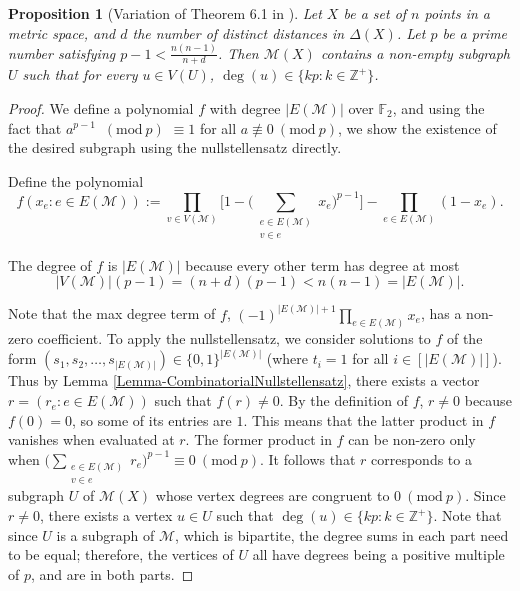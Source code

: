 \documentclass[12pt]{article}
\newcommand{\Z}{\mathbb{Z}}
\newcommand{\Mod}[1]{\ (\mathrm{mod}\ #1)}
\newtheorem{prop}[thm]{Proposition}
\theoremstyle{definition}
\begin{document}
	\begin{prop}[Variation of Theorem 6.1 in \cite{alon}]\label{Prop-SubgraphNullstellensatzResult}
		Let $X$ be a set of $n$ points in a metric space, and $d$ the number of distinct distances in $\Delta(X)$.  Let $p$ be a prime number satisfying $p-1 < \tfrac{n(n-1)}{n+d}$.  Then $\mathcal{M}(X)$ contains a non-empty subgraph $U$ such that for every $u \in V(U)$, $\deg(u) \in \{kp: k \in \Z^+\}$.  %
	\end{prop}
	\begin{proof}
		We define a polynomial $f$ with degree $|E(\mathcal{M})|$ over $\mathbb{F}_2$, and using the fact that $a^{p-1}$ $\Mod{p}$ $\equiv 1$ for all $a \not\equiv 0 \Mod{p}$, we show the existence of the desired subgraph using the nullstellensatz directly.
		
		Define the polynomial
		$$f(x_e:e \in E(\mathcal{M})) := \prod_{v \in V(\mathcal{M})} \biggr[1 - \Big(\sum_{\substack{e \in E(\mathcal{M})\\ v \in e}}x_e \Big)^{p-1} \biggr] - \prod_{e \in E(\mathcal{M})}(1-x_e).$$
		
		The degree of $f$ is $|E(\mathcal{M})|$ because every other term has degree at most
		$$|V(\mathcal{M})| (p-1) = (n+d)(p-1) < n(n-1) = |E(\mathcal{M})|.$$
		
		Note that the max degree term of $f$, $(-1)^{|E(\mathcal{M})|+1}\prod_{e \in E(\mathcal{M})} x_e$, has a non-zero coefficient. 
		To apply the nullstellensatz, we consider solutions to $f$ of the form $(s_1,s_2,\ldots,s_{|E(\mathcal{M})|}) \in \{0,1\}^{|E(\mathcal{M})|}$ (where $t_i = 1$ for all $i \in [|E(\mathcal{M})|]$).  Thus by Lemma \ref{Lemma-CombinatorialNullstellensatz}, there exists a vector $r=(r_e:e \in E(\mathcal{M}))$ such that $f(r) \neq 0$.  By the definition of $f$, $r \neq 0$ because $f(0) = 0$, so some of its entries are $1$.  This means that the latter product in $f$ vanishes when evaluated at $r$.  The former product in $f$ can be non-zero only when $\Big(\sum_{\substack{e \in E(\mathcal{M})\\ v \in e}}r_e \Big)^{p-1} \equiv 0 \Mod{p}$.  It follows that $r$ corresponds to a subgraph $U$ of $\mathcal{M}(X)$ whose vertex degrees are congruent to $0 \Mod{p}$.  Since $r \neq 0$, there exists a vertex $u \in U$ such that $\deg(u) \in \{kp: k \in \Z^+\}$.  Note that since $U$ is a subgraph of $\mathcal{M}$, which is bipartite, the degree sums in each part need to be equal; therefore, the vertices of $U$ all have degrees being a positive multiple of $p$, and are in both parts. \qedhere
	\end{proof}
	
\end{document}
